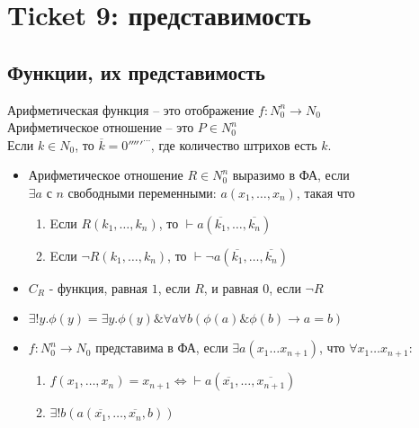 \section{Ticket 9: представимость}
\label{sec-11}
\subsection{Функции, их представимость}
\label{sec-11-1}
Арифметическая функция -- это отображение $f: N_0^n \to N_0$ \\
Арифметическое отношение -- это $P \in N_0^n$ \\
Если $k \in N_0$, то $\overline k = 0'''''^\cdots$, где количество штрихов есть $k$.
\begin{itemize}
\item Арифметическое отношение $R \in N_0^n$ выразимо в ФА, если\\
$\exists a$ с $n$ свободными переменными:
$a(x_1,\dotsc, x_n)$, такая что
\begin{enumerate}
\item Eсли $R(k_1,\dotsc, k_n)$, то $\vdash a(\overline{k_1}, \dotsc, \overline{k_n})$
\item Eсли $\lnot R(k_1, \dotsc, k_n)$, то $\vdash \lnot a(\overline{k_1}, \dotsc, \overline{k_n})$
\end{enumerate}
\item $C_R$ - функция, равная $1$, если $R$, и равная $0$, если $\lnot R$
\item $\exists !y.\phi(y) = \exists y.\phi(y) \& \forall a\forall b(\phi(a) \& \phi(b) \to a = b)$
\item $f: N_0^n \to N_0$ представима в ФА, если $\exists a(x_1\dots x_{n+1})$, что
$\forall x_1\dotsc x_{n+1}:$
\begin{enumerate}
\item $f(x_1, \dotsc, x_n) = x_{n+1} \Leftrightarrow \vdash a(\overline{x_1}, \dotsc, \overline{x_{n+1}})$
\item $\exists !b(a(\overline{x_1}, \dotsc, \overline{x_n}, b))$
\end{enumerate}
\end{itemize}
